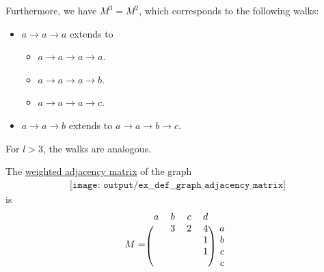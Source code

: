 \begin{example}
\begin{thmenum}
    Furthermore, we have \( M^3 = M^2 \), which corresponds to the following walks:
    \begin{itemize}
      \item \( a \to a \to a \) extends to
      \begin{itemize}
        \item \( a \to a \to a \to a \).
        \item \( a \to a \to a \to b \).
        \item \( a \to a \to a \to c \).
      \end{itemize}
      \item \( a \to a \to b \) extends to \( a \to a \to b \to c \).
    \end{itemize}

    For \( l > 3 \), the walks are analogous.

     The \hyperref[def:graph_adjacency_matrix]{weighted adjacency matrix} of the graph
    \begin{equation}\label{eq:ex:def:graph_adjacency_matrix/square/graph}
      \begin{aligned}
        \texttt{[image: output/ex\_\_def\_\_graph\_adjacency\_matrix]}
      \end{aligned}
    \end{equation}
    is
    \begin{equation}\label{eq:ex:def:graph_adjacency_matrix/square/graph/matrix}
      M =
      \begin{blockarray}{ccccc}
        a & b & c & d & \\
      \begin{block}{(cccc)c}
          & 3 & 2 & 4 & a \\
          &   &   & 1 & b \\
          &   &   & 1 & c \\
          &   &   &   & c \\
      \end{block}
      \end{blockarray}
    \end{equation}


\end{thmenum}
\end{example}
